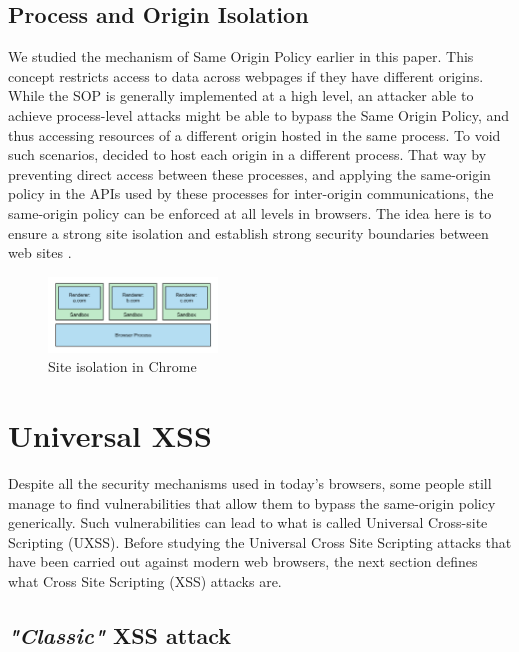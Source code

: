 \documentclass[journal]{IEEEtran}
\begin{document}
\subsection{Process and Origin Isolation}

We studied the mechanism of Same Origin Policy earlier in this paper. This concept restricts access to data across webpages if they have different origins. While the SOP is generally implemented at a high level, an attacker able to achieve process-level attacks might be able to bypass the Same Origin Policy, and thus accessing resources of a different origin hosted in the same process. To void such scenarios, decided to host each origin in a different process. That way by preventing direct access between these processes, and applying the same-origin policy in the APIs used by these processes for inter-origin communications, the same-origin policy can be enforced at all levels in browsers. The idea here is to ensure a strong site isolation and establish strong security boundaries between web sites \cite{isolationChrome}.

\begin{figure}[h]
\centering
\includegraphics[width=0.4\textwidth]{images/IsolationChrome.png}
\caption{Site isolation in Chrome}
\label{fig:ChromeIsolation}
\end{figure}

\section{Universal XSS}

Despite all the security mechanisms used in today's browsers, some people still manage to find vulnerabilities that allow them to bypass the same-origin policy generically. Such vulnerabilities can lead to what is called Universal Cross-site Scripting (UXSS).
Before studying the Universal Cross Site Scripting attacks that have been carried out against modern web browsers, the next section defines what Cross Site Scripting (XSS) attacks are.

\subsection{\emph{"Classic"} XSS attack}
\end{document}

